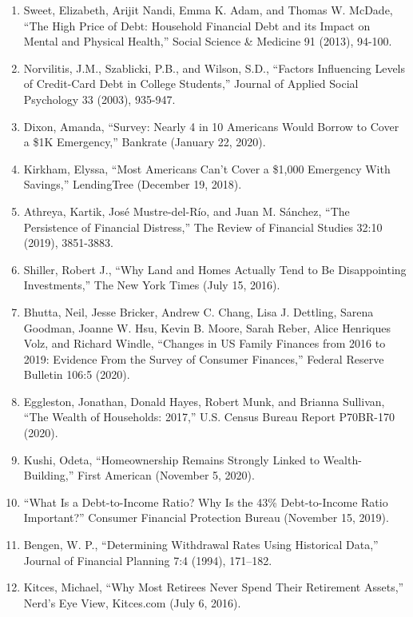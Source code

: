 \begin{enumerate}
\item\hypertarget{endnote:40}{} Sweet, Elizabeth, Arijit Nandi, Emma K. Adam, and Thomas W. McDade, “The High Price of Debt: Household Financial Debt and its Impact on Mental and Physical Health,” Social Science \& Medicine 91 (2013), 94-100.
\item\hypertarget{endnote:41}{} Norvilitis, J.M., Szablicki, P.B., and Wilson, S.D., “Factors Influencing Levels of Credit-Card Debt in College Students,” Journal of Applied Social Psychology 33 (2003), 935-947.
\item\hypertarget{endnote:42}{} Dixon, Amanda, “Survey: Nearly 4 in 10 Americans Would Borrow to Cover a \$1K Emergency,” Bankrate (January 22, 2020).
\item\hypertarget{endnote:43}{} Kirkham, Elyssa, “Most Americans Can't Cover a \$1,000 Emergency With Savings,” LendingTree (December 19, 2018).
\item\hypertarget{endnote:44}{} Athreya, Kartik, José Mustre-del-Río, and Juan M. Sánchez, “The Persistence of Financial Distress,” The Review of Financial Studies 32:10 (2019), 3851-3883.
\item\hypertarget{endnote:45}{} Shiller, Robert J., “Why Land and Homes Actually Tend to Be Disappointing Investments,” The New York Times (July 15, 2016).
\item\hypertarget{endnote:46}{} Bhutta, Neil, Jesse Bricker, Andrew C. Chang, Lisa J. Dettling, Sarena Goodman, Joanne W. Hsu, Kevin B. Moore, Sarah Reber, Alice Henriques Volz, and Richard Windle, “Changes in US Family Finances from 2016 to 2019: Evidence From the Survey of Consumer Finances,” Federal Reserve Bulletin 106:5 (2020).
\item\hypertarget{endnote:47}{} Eggleston, Jonathan, Donald Hayes, Robert Munk, and Brianna Sullivan, “The Wealth of Households: 2017,” U.S. Census Bureau Report P70BR-170 (2020).
\item\hypertarget{endnote:48}{} Kushi, Odeta, “Homeownership Remains Strongly Linked to Wealth-Building,” First American (November 5, 2020).
\item\hypertarget{endnote:49}{} “What Is a Debt-to-Income Ratio? Why Is the 43\% Debt-to-Income Ratio Important?” Consumer Financial Protection Bureau (November 15, 2019).
\item\hypertarget{endnote:50}{} Bengen, W. P., “Determining Withdrawal Rates Using Historical Data,” Journal of Financial Planning 7:4 (1994), 171–182.
\item\hypertarget{endnote:51}{} Kitces, Michael, “Why Most Retirees Never Spend Their Retirement Assets,” Nerd's Eye View, Kitces.com (July 6, 2016).

\end{enumerate}
